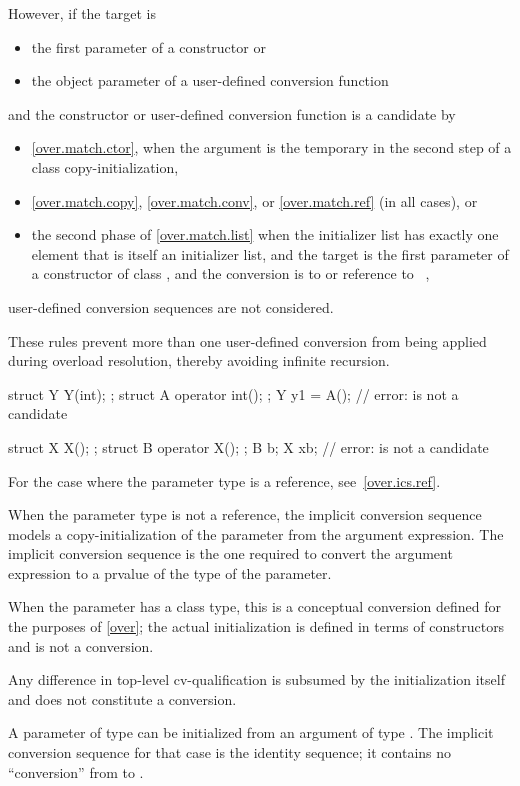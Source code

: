 \pnum
However, if the target is
\begin{itemize}
\item the first parameter of a constructor or
\item the object parameter of a user-defined conversion function
\end{itemize}
and the constructor or user-defined conversion function is a candidate by
\begin{itemize}
\item \ref{over.match.ctor}, when the argument is the temporary in the second
step of a class copy-initialization,
\item \ref{over.match.copy}, \ref{over.match.conv}, or \ref{over.match.ref}
(in all cases), or
\item the second phase of \ref{over.match.list}
when the initializer list has exactly one element that
is itself an initializer list, and
the target is the first parameter of a constructor of class , and
the conversion is to  or reference to \cv{}~,
\end{itemize}
user-defined conversion sequences are not considered.
\begin{note}
These rules prevent more than one user-defined conversion from being
applied during overload resolution, thereby avoiding infinite recursion.
\end{note}
\begin{example}
\begin{codeblock}
struct Y { Y(int); };
struct A { operator int(); };
Y y1 = A();         // error:  is not a candidate

struct X { X(); };
struct B { operator X(); };
B b;
X x{{b}};           // error:  is not a candidate
\end{codeblock}
\end{example}

\pnum
For the case where the parameter type is a reference, see~\ref{over.ics.ref}.

\pnum
When the parameter type is not a reference, the implicit conversion
sequence models a copy-initialization of the parameter from the argument
expression.
The implicit conversion sequence is the one required to convert the
argument expression to a prvalue of the type of
the parameter.
\begin{note}
When the parameter has a class type, this is a conceptual conversion
defined for the purposes of \ref{over}; the actual initialization is
defined in terms of constructors and is not a conversion.
\end{note}
Any difference in top-level cv-qualification is
subsumed by the initialization itself and does not constitute a conversion.
\begin{example}
A parameter of type
can be initialized from an argument of type
.
The implicit conversion sequence for that case is the identity sequence; it
contains no ``conversion'' from
to
.
\end{example}


